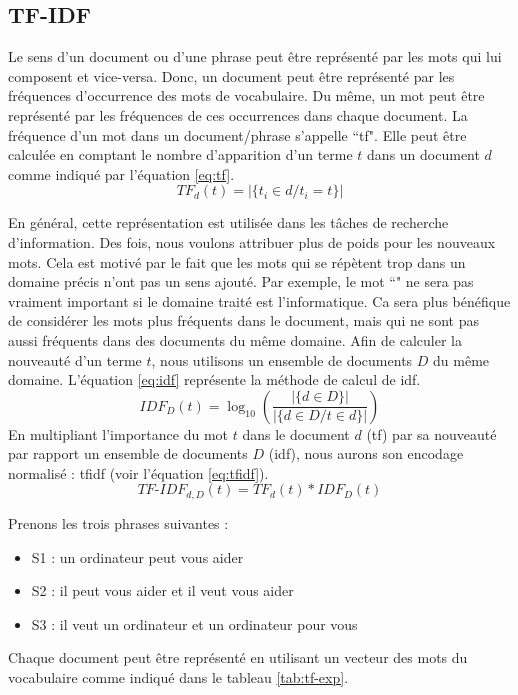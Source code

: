 \documentclass{KodeBook}
\begin{document}
\subsection{TF-IDF}

Le sens d'un document ou d'une phrase peut être représenté par les mots qui lui composent et vice-versa.
Donc, un document peut être représenté par les fréquences d'occurrence des mots de vocabulaire. 
Du même, un mot peut être représenté par les fréquences de ces occurrences dans chaque document.
La fréquence d'un mot dans un document/phrase s'appelle ``\ac{tf}".
Elle peut être calculée en comptant le nombre d'apparition d'un terme $t$ dans un document $d$ comme indiqué par l'équation \ref{eq:tf}.
\begin{equation}
TF_d(t) =  |\{t_i \in d / t_i = t\}|
\label{eq:tf}
\end{equation}

En général, cette représentation est utilisée dans les tâches de recherche d'information.
Des fois, nous voulons attribuer plus de poids pour les nouveaux mots. 
Cela est motivé par le fait que les mots qui se répètent trop dans un domaine précis n'ont pas un sens ajouté.
Par exemple, le mot ``" ne sera pas vraiment important si le domaine traité est l'informatique. 
Ca sera plus bénéfique de considérer les mots plus fréquents dans le document, mais qui ne sont pas aussi fréquents dans des documents du même domaine.
Afin de calculer la nouveauté d'un terme $t$, nous utilisons un ensemble de documents $D$ du même domaine. 
L'équation \ref{eq:idf} représente la méthode de calcul de \ac{idf}.
\begin{equation}
IDF_D(t) = \log_{10} \left( \frac{|\{d \in D\}|}{|\{d \in D / t \in d\}|} \right)
\label{eq:idf}
\end{equation}
En multipliant l'importance du mot $t$ dans le document $d$ (\ac{tf}) par sa nouveauté par rapport un ensemble de documents $D$ (\ac{idf}), nous aurons son encodage normalisé : \ac{tfidf} (voir l'équation \ref{eq:tfidf}).
\begin{equation}
TF\text{-}IDF_{d, D}(t) = TF_d(t) * IDF_D(t)
\label{eq:tfidf}
\end{equation}

Prenons les trois phrases suivantes :
\begin{itemize}
	\item S1 : un ordinateur peut vous aider
	\item S2 : il peut vous aider et il veut vous aider
	\item S3 : il veut un ordinateur et un ordinateur pour vous
\end{itemize}
Chaque document peut être représenté en utilisant un vecteur des mots du vocabulaire comme indiqué dans le tableau \ref{tab:tf-exp}.
 
\end{document}
